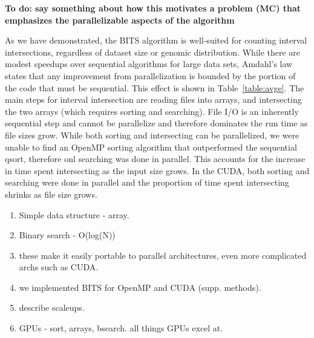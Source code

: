 \documentclass{bioinfo}
\begin{document}
                
        \textbf{To do: say something about how this motivates a problem (MC)
        that emphasizes the parallelizable aspects of the algorithm}
        
        As we have demonstrated, the BITS algorithm is well-suited for counting interval
        intersections, regardless of dataset size or genomic distribution.  While there
        are modest speedups over sequential algorithms for large data sets, Amdahl's
        law~\cite{amdahl1967} states that any improvement from parallelization is
        bounded by  the portion of the code that must be sequential.  This effect is
        shown in Table~\ref{table:avge}.  The main steps for interval intersection are
        reading files into arrays, and intersecting the two arrays (which requires
        sorting and searching).  File I/O is an inherently sequential step and cannot be
        parallelize and therefore dominates the run time as file sizes grow.  While both
        sorting and intersecting can be parallelized, we were unable to find an OpenMP
        sorting algorithm that outperformed the sequential qsort, therefore onl
        searching was done in parallel.  This accounts for the increase in time spent
        intersecting as the input size grows.  In the CUDA, both sorting and searching
        were done in parallel and the proportion of time spent intersecting shrinks as
        file size grows.
        
        \begin{enumerate}
                \item Simple data structure - array.
                \item Binary search - O(log(N))
                \item these make it easily portable to parallel architectures, even 
                      more complicated archs such as CUDA.
                \item we implemented BITS for OpenMP and CUDA (supp. methods).
                \item describe scaleups.
                \item GPUs - sort, arrays, bsearch.  all things GPUs excel at.
        \end{enumerate} 
        
\end{document}
